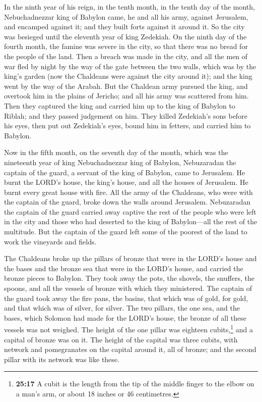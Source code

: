  In the ninth year of his reign, in the tenth month, in
the tenth day of the month, Nebuchadnezzar king of Babylon came, he and
all his army, against Jerusalem, and encamped against it; and they built
forts against it around it.  So the city was besieged
until the eleventh year of king Zedekiah.  On the ninth
day of the fourth month, the famine was severe in the city, so that
there was no bread for the people of the land.  Then a
breach was made in the city, and all the men of war fled by night by the
way of the gate between the two walls, which was by the king's garden
(now the Chaldeans were against the city around it); and the king went
by the way of the Arabah.  But the Chaldean army pursued
the king, and overtook him in the plains of Jericho; and all his army
was scattered from him.  Then they captured the king and
carried him up to the king of Babylon to Riblah; and they passed
judgement on him.  They killed Zedekiah's sons before his
eyes, then put out Zedekiah's eyes, bound him in fetters, and carried
him to Babylon.

 Now in the fifth month, on the seventh day of the month,
which was the nineteenth year of king Nebuchadnezzar king of Babylon,
Nebuzaradan the captain of the guard, a servant of the king of Babylon,
came to Jerusalem.  He burnt the LORD's house, the king's
house, and all the houses of Jerusalem. He burnt every great house with
fire.  All the army of the Chaldeans, who were with the
captain of the guard, broke down the walls around Jerusalem.
 Nebuzaradan the captain of the guard carried away
captive the rest of the people who were left in the city and those who
had deserted to the king of Babylon---all the rest of the multitude.
 But the captain of the guard left some of the poorest of
the land to work the vineyards and fields.

 The Chaldeans broke up the pillars of bronze that were
in the LORD's house and the bases and the bronze sea that were in the
LORD's house, and carried the bronze pieces to Babylon. 
They took away the pots, the shovels, the snuffers, the spoons, and all
the vessels of bronze with which they ministered.  The
captain of the guard took away the fire pans, the basins, that which was
of gold, for gold, and that which was of silver, for silver.
 The two pillars, the one sea, and the bases, which
Solomon had made for the LORD's house, the bronze of all these vessels
was not weighed.  The height of the one pillar was
eighteen cubits,\footnote{\textbf{25:17} A cubit is the length from the
  tip of the middle finger to the elbow on a man's arm, or about 18
  inches or 46 centimetres.} and a capital of bronze was on it. The
height of the capital was three cubits, with network and pomegranates on
the capital around it, all of bronze; and the second pillar with its
network was like these.

